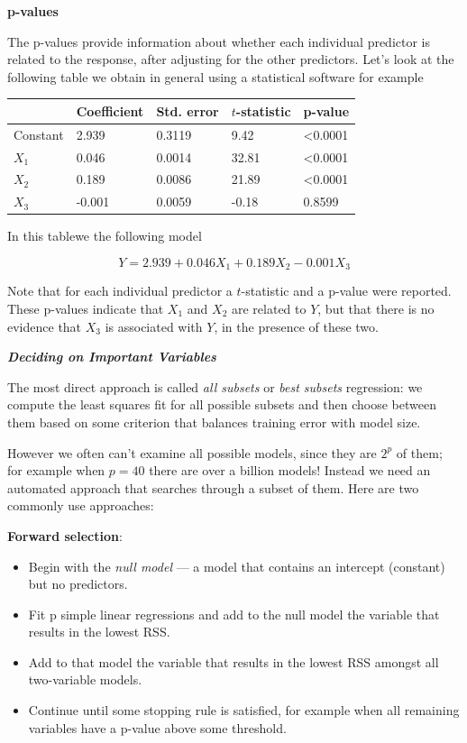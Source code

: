 \documentclass[]{book}
\providecommand{\tightlist}{%
  \setlength{\itemsep}{0pt}\setlength{\parskip}{0pt}}
\begin{document}
\textbf{p-values}

The p-values provide information about whether each individual predictor
is related to the response, after adjusting for the other predictors.
Let's look at the following table we obtain in general using a
statistical software for example

\begin{longtable}[]{@{}lllll@{}}
\toprule
& Coefficient & Std. error & \(t\)-statistic & p-value\tabularnewline
\midrule
\endhead
Constant & 2.939 & 0.3119 & 9.42 & \textless{}0.0001\tabularnewline
\(X_1\) & 0.046 & 0.0014 & 32.81 & \textless{}0.0001\tabularnewline
\(X_2\) & 0.189 & 0.0086 & 21.89 & \textless{}0.0001\tabularnewline
\(X_3\) & -0.001 & 0.0059 & -0.18 & 0.8599\tabularnewline
\bottomrule
\end{longtable}

In this tablewe the following model

\[ Y = 2.939 + 0.046 X_1 + 0.189 X_2 - 0.001 X_3 \]

Note that for each individual predictor a \(t\)-statistic and a p-value
were reported. These p-values indicate that \(X_1\) and \(X_2\) are
related to \(Y\), but that there is no evidence that \(X_3\) is
associated with \(Y\), in the presence of these two.

\textbf{\emph{Deciding on Important Variables}}

The most direct approach is called \emph{all subsets} or \emph{best
subsets} regression: we compute the least squares fit for all possible
subsets and then choose between them based on some criterion that
balances training error with model size.

However we often can't examine all possible models, since they are
\(2^p\) of them; for example when \(p = 40\) there are over a billion
models! Instead we need an automated approach that searches through a
subset of them. Here are two commonly use approaches:

\textbf{Forward selection}:

\begin{itemize}
\tightlist
\item
  Begin with the \emph{null model} --- a model that contains an
  intercept (constant) but no predictors.
\item
  Fit p simple linear regressions and add to the null model the variable
  that results in the lowest RSS.
\item
  Add to that model the variable that results in the lowest RSS amongst
  all two-variable models.
\item
  Continue until some stopping rule is satisfied, for example when all
  remaining variables have a p-value above some threshold.
\end{itemize}
\end{document}
